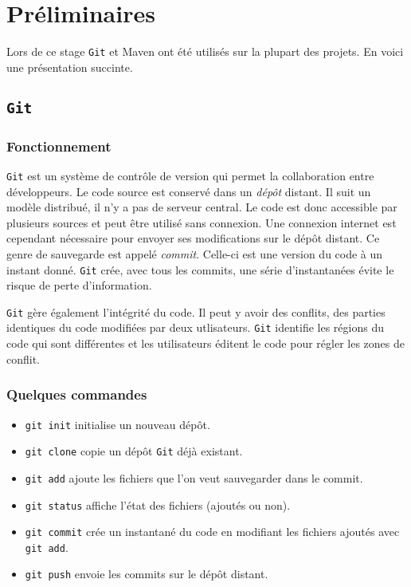 \chapter*{Préliminaires}
Lors de ce stage \texttt{Git} et Maven ont été utilisés sur la plupart des projets. En voici une présentation succinte.
\section*{\texttt{Git}}
\subsection*{Fonctionnement}
\texttt{Git} est un système de contrôle de version qui permet la collaboration entre développeurs. Le code source est conservé dans un \textit{dépôt} distant. Il suit un modèle distribué, il n'y a pas de serveur central. Le code est donc accessible par plusieurs sources et peut être utilisé sans connexion. Une connexion internet est cependant nécessaire pour envoyer ses modifications sur le dépôt distant. Ce genre de sauvegarde est appelé \textit{commit}. Celle-ci est une version du code à un instant donné. \texttt{Git} crée, avec tous les commits, une série d’instantanées évite le risque de perte d'information.

\texttt{Git} gère également l'intégrité du code. Il peut y avoir des conflits, des parties identiques du code modifiées par deux utlisateurs. \texttt{Git} identifie les régions du code qui sont différentes et les utilisateurs éditent le code pour régler les zones de conflit.

\subsection*{Quelques commandes}

\begin{itemize}
    \item \texttt{git init} initialise un nouveau dépôt.
    \item \texttt{git clone} copie un dépôt \texttt{Git} déjà existant.
    \item \texttt{git add} ajoute les fichiers que l'on veut sauvegarder dans le commit.
    \item \texttt{git status} affiche l'état des fichiers (ajoutés ou non).
    \item \texttt{git commit} crée un instantané du code en modifiant les fichiers ajoutés avec \texttt{git add}.
    \item \texttt{git push} envoie les commits sur le dépôt distant.
\end{itemize}

